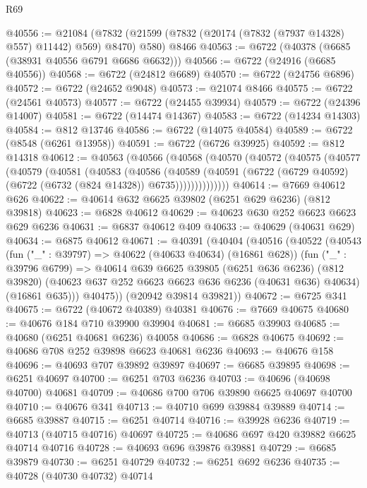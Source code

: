 \begin{lexlean}{R69}
\begin{coremodule}
{@40556 := @21084
    (@7832 (@21599 (@7832 (@20174 (@7832 (@7937 @14328) @557) @11442) @569) @8470) @580)
    @8466
@40563 := @6722 (@40378 (@6685 (@38931 @40556 @6791 @6686 @6632)))
@40566 := @6722 (@24916 (@6685 @40556))
@40568 := @6722 (@24812 @6689)
@40570 := @6722 (@24756 @6896)
@40572 := @6722 (@24652 @9048)
@40573 := @21074 @8466
@40575 := @6722 (@24561 @40573)
@40577 := @6722 (@24455 @39934)
@40579 := @6722 (@24396 @14007)
@40581 := @6722 (@14474 @14367)
@40583 := @6722 (@14234 @14303)
@40584 := @812 @13746
@40586 := @6722 (@14075 @40584)
@40589 := @6722 (@8548 (@6261 @13958))
@40591 := @6722 (@6726 @39925)
@40592 := @812 @14318
@40612 := @40563
    (@40566
      (@40568
        (@40570
          (@40572
            (@40575
              (@40577
                (@40579
                  (@40581
                    (@40583
                      (@40586
                        (@40589
                          (@40591
                            (@6722 (@6729 @40592) (@6722 (@6732 (@824 @14328)) @6735))))))))))))))
@40614 := @7669 @40612 @626
@40622 := @40614 @632 @6625 @39802 (@6251 @629 @6236) (@812 @39818)
@40623 := @6828 @40612
@40629 := @40623 @630 @252 @6623 @6623 @629 @6236
@40631 := @6837 @40612 @409
@40633 := @40629 (@40631 @629)
@40634 := @6875 @40612
@40671 := @40391
    (@40404
      (@40516
        (@40522
          (@40543
            (fun ("_" : @39797) => @40622 (@40633 @40634) (@16861 @628))
            (fun ("_" : @39796 @6799) =>
            @40614
              @639
              @6625
              @39805
              (@6251 @636 @6236)
              (@812 @39820)
              (@40623 @637 @252 @6623 @6623 @636 @6236 (@40631 @636) @40634)
              (@16861 @635)))
          @40475))
      (@20942 @39814 @39821))
@40672 := @6725 @341
@40675 := @6722 (@40672 @40389) @40381
@40676 := @7669 @40675
@40680 := @40676 @184 @710 @39900 @39904
@40681 := @6685 @39903
@40685 := @40680 (@6251 @40681 @6236) @40058
@40686 := @6828 @40675
@40692 := @40686 @708 @252 @39898 @6623 @40681 @6236
@40693 := @40676 @158
@40696 := @40693 @707 @39892 @39897
@40697 := @6685 @39895
@40698 := @6251 @40697
@40700 := @6251 @703 @6236
@40703 := @40696 (@40698 @40700) @40681
@40709 := @40686 @700 @706 @39890 @6625 @40697 @40700
@40710 := @40676 @341
@40713 := @40710 @699 @39884 @39889
@40714 := @6685 @39887
@40715 := @6251 @40714
@40716 := @39928 @6236
@40719 := @40713 (@40715 @40716) @40697
@40725 := @40686 @697 @420 @39882 @6625 @40714 @40716
@40728 := @40693 @696 @39876 @39881
@40729 := @6685 @39879
@40730 := @6251 @40729
@40732 := @6251 @692 @6236
@40735 := @40728 (@40730 @40732) @40714
}
\end{coremodule}
\end{lexlean}
